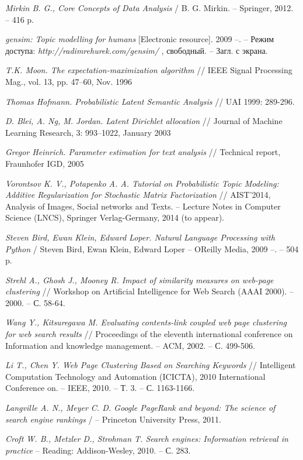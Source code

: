 \documentclass[12pt]{report}
\begin{document}
\begin{thebibliography}{99}
{\it Mirkin B. G., Core Concepts of Data Analysis} / B. G. Mirkin. -- Springer, 2012. -- 416 p.
 
{\it  gensim: Topic modelling for humans } [Electronic resource]. 2009 --. -- Режим доступа: {\it
  http://radimrehurek.com/gensim/ }, свободный. -- Загл. с экрана.

{\it  T.K. Moon. The expectation-maximization algorithm } // IEEE Signal Processing Mag., vol. 13, pp. 47–60, Nov. 1996

{\it Thomas Hofmann. Probabilistic Latent Semantic Analysis } // UAI 1999: 289-296. 

{\it D. Blei, A. Ng, M. Jordan. Latent Dirichlet allocation } // Journal of Machine Learning Research, 3: 993–1022, January 2003  

{\it Gregor Heinrich. Parameter estimation for text analysis} // Technical report, Fraunhofer IGD, 2005

{\it Vorontsov K. V., Potapenko A. A. Tutorial on Probabilistic Topic Modeling: Additive Regularization for Stochastic Matrix Factorization } // AIST'2014, Analysis of Images, Social networks and Texts. -- Lecture Notes in Computer Science (LNCS), Springer Verlag-Germany, 2014 (to appear). 

{\it Steven Bird, Ewan Klein, Edward Loper. Natural Language Processing with Python } / Steven Bird, Ewan Klein, Edward Loper -- OReilly Media, 2009 --. -- 504 p.

{\it Strehl A., Ghosh J., Mooney R. Impact of similarity measures on web-page clustering} // Workshop on Artificial Intelligence for Web Search (AAAI 2000). – 2000. – С. 58-64.

{\it Wang Y., Kitsuregawa M. Evaluating contents-link coupled web page clustering for web search results} // Proceedings of the eleventh international conference on Information and knowledge management. – ACM, 2002. – С. 499-506.

{\it Li T., Chen Y. Web Page Clustering Based on Searching Keywords} // Intelligent Computation Technology and Automation (ICICTA), 2010 International Conference on. – IEEE, 2010. – Т. 3. – С. 1163-1166.

{\it Langville A. N., Meyer C. D. Google PageRank and beyond: The science of search engine rankings} / -- Princeton University Press, 2011.

{\it Croft W. B., Metzler D., Strohman T. Search engines: Information retrieval in practice} -- Reading: Addison-Wesley, 2010. -- С. 283.


\end{thebibliography}
\end{document}
